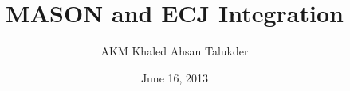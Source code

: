\documentclass{beamer}
\title[MASON and ECJ]{MASON and ECJ Integration} %
\author{AKM Khaled Ahsan Talukder} %
\institute[GMU] %
{
George Mason University \\ %
\medskip
\textit{atalukde@gmu.edu} \\ %
}
\date{June 16, 2013}
\begin{document}
\begin{frame}
\titlepage %
\end{frame}



\end{document}
